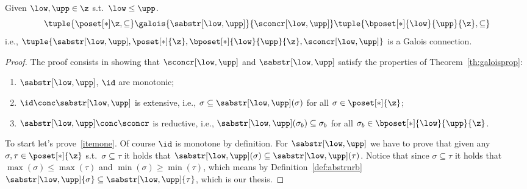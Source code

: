 \begin{lemma}
  Given \(\low, \upp \in \z\) s.t.\ \(\low\leq \upp\).
  \begin{equation*}
    \tuple{\poset[*]\z, \subseteq} \galois{\sabstr[\low,\upp]}{\sconcr[\low,\upp]} \tuple{\bposet[*]{\low}{\upp}{\z}, \subseteq}
  \end{equation*}
  i.e.,
  \(\tuple{\sabstr[\low,\upp], \poset[*]{\z},
    {\bposet[*]{\low}{\upp}{\z}}, \sconcr[\low,\upp]}\) is a Galois connection.
\end{lemma} 

\begin{proof}
  The proof consists in showing that \(\sconcr[\low,\upp]\) and
  \(\sabstr[\low,\upp]\) satisfy the properties of
  Theorem~\ref{th:galoisprop}:
  \begin{enumerate}[label={(\arabic*)}]
  \item\label{itemone} \(\sabstr[\low,\upp]\), \(\id\) are monotonic;
  \item\label{itemtwo} \(\id \conc \sabstr[\low, \upp]\) is extensive, i.e.,
    \(\sigma \subseteq \sabstr[\low,\upp](\sigma)\) for all
    \(\sigma \in \poset[*]{\z}\);
  \item\label{itemthree} \(\sabstr[\low,\upp] \conc\sconcr\) is reductive, i.e.,
    \(\sabstr[\low,\upp](\sigma_b) \subseteq \sigma_b\) for all
    \(\sigma_b \in \bposet[*]{\low}{\upp}{\z}\).
  \end{enumerate}
  To start let's prove~\ref{itemone}. Of course \(\id\) is monotone by
  definition. For \(\sabstr[\low,\upp]\) we have to prove that given any
  \(\sigma, \tau \in \poset[*]{\z}\) s.t.\ \(\sigma \subseteq \tau\)
  it holds that
  \(\sabstr[\low,\upp](\sigma) \subseteq \sabstr[\low,\upp](\tau)\). Notice
  that since \(\sigma \subseteq \tau\) it holds that
  \(\max(\sigma) \leq \max(\tau)\) and
  \(\min(\sigma) \geq \min(\tau)\), which means by
  Definition~\ref{def:abstrnrb}
  \(\sabstr[\low,\upp]{\sigma} \subseteq \sabstr[\low,\upp]{\tau}\), which
  is our thesis.

  \medskip


\end{proof}
